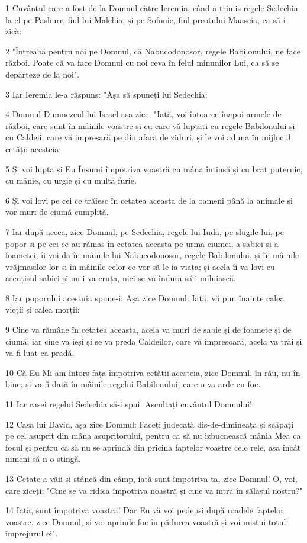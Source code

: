 \par 1 Cuvântul care a fost de la Domnul către Ieremia, când a trimis regele Sedechia la el pe Pașhurr, fiul lui Malchia, și pe Sofonie, fiul preotului Maaseia, ca să-i zică:
\par 2 "Întreabă pentru noi pe Domnul, că Nabucodonosor, regele Babilonului, ne face război. Poate că va face Domnul cu noi ceva în felul minunilor Lui, ca să se depărteze de la noi".
\par 3 Iar Ieremia le-a răspuns: "Așa să spuneți lui Sedechia:
\par 4 Domnul Dumnezeul lui Israel așa zice: "Iată, voi întoarce înapoi armele de război, care sunt în mâinile voastre și cu care vă luptați cu regele Babilonului și cu Caldeii, care vă impresară pe din afară de ziduri, și le voi aduna în mijlocul cetății acesteia;
\par 5 Și voi lupta și Eu Însumi împotriva voastră cu mâna întinsă și cu braț puternic, cu mânie, cu urgie și cu multă furie.
\par 6 Și voi lovi pe cei ce trăiesc în cetatea aceasta de la oameni până la animale și vor muri de ciumă cumplită.
\par 7 Iar după aceea, zice Domnul, pe Sedechia, regele lui Iuda, pe slugile lui, pe popor și pe cei ce au rămas în cetatea aceasta pe urma ciumei, a sabiei și a foametei, îi voi da în mâinile lui Nabucodonosor, regele Babilonului, și în mâinile vrăjmașilor lor și în mâinile celor ce vor să le ia viața; și acela îi va lovi cu ascuțișul sabiei și nu-i va cruța, nici se va îndura să-i miluiască.
\par 8 Iar poporului acestuia spune-i: Așa zice Domnul: Iată, vă pun înainte calea vieții și calea morții:
\par 9 Cine va rămâne în cetatea aceasta, acela va muri de sabie și de foamete și de ciumă; iar cine va ieși și se va preda Caldeilor, care vă împresoară, acela va trăi și va fi luat ca pradă,
\par 10 Că Eu Mi-am întors fața împotriva cetății acesteia, zice Domnul, în rău, nu în bine; și va fi dată în mâinile regelui Babilonului, care o va arde cu foc.
\par 11 Iar casei regelui Sedechia să-i spui: Ascultați cuvântul Domnului!
\par 12 Casa lui David, așa zice Domnul: Faceți judecată dis-de-dimineață și scăpați pe cel asuprit din mâna asupritorului, pentru ca să nu izbucnească mânia Mea ca focul și pentru ca să nu se aprindă din pricina faptelor voastre cele rele, așa încât nimeni să n-o stingă.
\par 13 Cetate a văii și stâncă din câmp, iată sunt împotriva ta, zice Domnul! O, voi, care ziceți: "Cine se va ridica împotriva noastră și cine va intra în sălașul nostru?"
\par 14 Iată, sunt împotriva voastră! Dar Eu vă voi pedepsi după roadele faptelor voastre, zice Domnul, și voi aprinde foc în pădurea voastră și voi mistui totul împrejurul ei".


